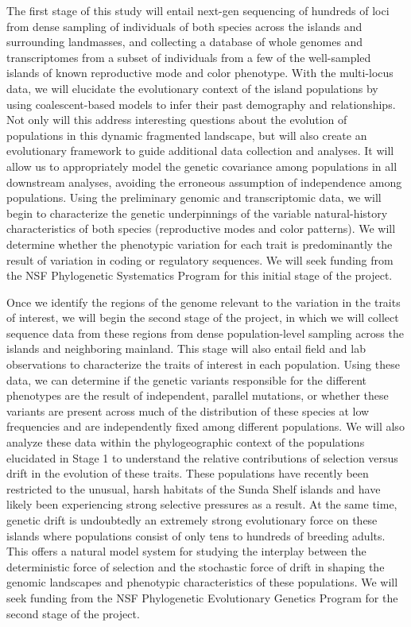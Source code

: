 \documentclass[10pt]{article}
\begin{document}
The first stage of this study will entail next-gen sequencing of hundreds of loci from dense sampling of individuals of both species across the islands and surrounding landmasses, and collecting a database of whole genomes and transcriptomes from a subset of individuals from a few of the well-sampled islands of known reproductive mode and color phenotype.
With the multi-locus data, we will elucidate the evolutionary context of the island populations by using coalescent-based models to infer their past demography and relationships.
Not only will this address interesting questions about the evolution of populations in this dynamic fragmented landscape, but will also create an evolutionary framework to guide additional data collection and analyses.
It will allow us to appropriately model the genetic covariance among populations in all downstream analyses, avoiding the erroneous assumption of independence among populations.
Using the preliminary genomic and transcriptomic data, we will begin to characterize the genetic underpinnings of the variable natural-history characteristics of both species (reproductive modes and color patterns).
We will determine whether the phenotypic variation for each trait is predominantly the result of variation in coding or regulatory sequences.
We will seek funding from the NSF Phylogenetic Systematics Program for this initial stage of the project.

Once we identify the regions of the genome relevant to the variation in the traits of interest, we will begin the second stage of the project, in which we will collect sequence data from these regions from dense population-level sampling across the islands and neighboring mainland.
This stage will also entail field and lab observations to characterize the traits of interest in each population.
Using these data, we can determine if the genetic variants responsible for the different phenotypes are the result of independent, parallel mutations, or whether these variants are present across much of the distribution of these species at low frequencies and are independently fixed among different populations.
We will also analyze these data within the phylogeographic context of the populations elucidated in Stage 1 to understand the relative contributions of selection versus drift in the evolution of these traits.
These populations have recently been restricted to the unusual, harsh habitats of the Sunda Shelf islands and have likely been experiencing strong selective pressures as a result.
At the same time, genetic drift is undoubtedly an extremely strong evolutionary force on these islands where populations consist of only tens to hundreds of breeding adults.
This offers a natural model system for studying the interplay between the deterministic force of selection and the stochastic force of drift in shaping the genomic landscapes and phenotypic characteristics of these populations.
We will seek funding from the NSF Phylogenetic Evolutionary Genetics Program for the second stage of the project.
\end{document}
